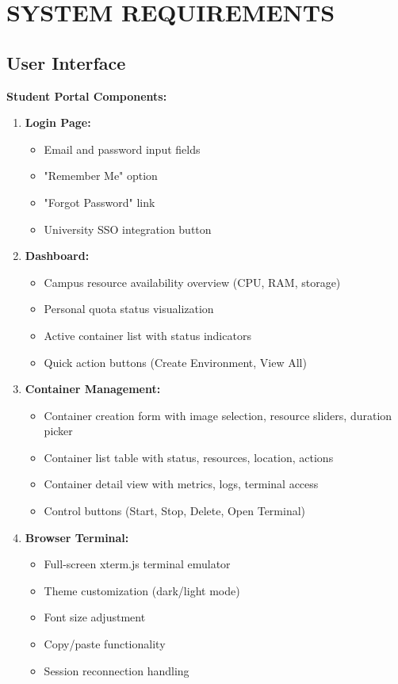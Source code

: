 \documentclass[12pt,a4paper]{article}
\begin{document}
\newpage
\section{SYSTEM REQUIREMENTS}
\label{sec:sysreq}

\subsection{User Interface}
\label{sec:ui}

\textbf{Student Portal Components:}

\begin{enumerate}
    \item \textbf{Login Page:}
    \begin{itemize}
        \item Email and password input fields
        \item "Remember Me" option
        \item "Forgot Password" link
        \item University SSO integration button
    \end{itemize}
    
    \item \textbf{Dashboard:}
    \begin{itemize}
        \item Campus resource availability overview (CPU, RAM, storage)
        \item Personal quota status visualization
        \item Active container list with status indicators
        \item Quick action buttons (Create Environment, View All)
    \end{itemize}
    
    \item \textbf{Container Management:}
    \begin{itemize}
        \item Container creation form with image selection, resource sliders, duration picker
        \item Container list table with status, resources, location, actions
        \item Container detail view with metrics, logs, terminal access
        \item Control buttons (Start, Stop, Delete, Open Terminal)
    \end{itemize}
    
    \item \textbf{Browser Terminal:}
    \begin{itemize}
        \item Full-screen xterm.js terminal emulator
        \item Theme customization (dark/light mode)
        \item Font size adjustment
        \item Copy/paste functionality
        \item Session reconnection handling
    \end{itemize}
    

\end{enumerate}
\end{document}
